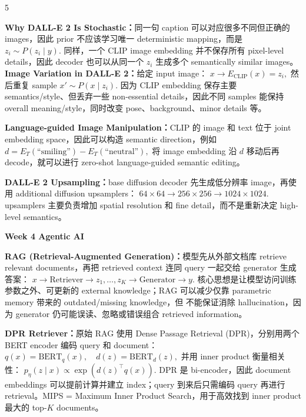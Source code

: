 \documentclass[a4paper, landscape]{article}
\newcommand{\topic}[1]{\par\medskip\textbf{#1}\par}
\renewcommand{\topic}[1]{%
  \par\smallskip\noindent
  \colorbox{highlightcolor}{%
    \parbox{\dimexpr\columnwidth-2\fboxsep\relax}{%
      \textbf{#1}%
    }%
  }%
  \par
}
\begin{document}
\begin{multicols}{5}
\par \textbf{Why DALL-E 2 Is Stochastic：}同一句 caption 可以对应很多不同但正确的 images，因此 prior 不应该学习唯一 deterministic mapping，而是
\(
z_i\sim P(z_i\mid y).
\)
同样，一个 CLIP image embedding 并不保存所有 pixel-level details，因此 decoder 也可以从同一个 \(z_i\) 生成多个 semantically similar images。
\textbf{Image Variation in DALL-E 2：}给定 input image：
\(
x\rightarrow E_{\mathrm{CLIP}}(x)=z_i,
\)
然后重复 sample
\(
x'\sim P(x\mid z_i).
\)
因为 CLIP embedding 保存主要 semantics/style、但丢弃一些 non-essential details，因此不同 samples 能保持 overall meaning/style，同时改变 pose、background、minor details 等。

\par \textbf{Language-guided Image Manipulation：}CLIP 的 image 和 text 位于 joint embedding space，因此可以构造 semantic direction，例如
\(
d=
E_T(\text{``smiling''})
-
E_T(\text{``neutral''}),
\)
将 image embedding 沿 \(d\) 移动后再 decode，就可以进行 zero-shot language-guided semantic editing。

\par \textbf{DALL-E 2 Upsampling：}base diffusion decoder 先生成低分辨率 image，再使用 additional diffusion upsamplers：
\(
64\times64
\rightarrow
256\times256
\rightarrow
1024\times1024.
\)
upsamplers 主要负责增加 spatial resolution 和 fine detail，而不是重新决定 high-level semantics。


\topic{Week 4 Agentic AI}
\par \textbf{RAG (Retrieval-Augmented Generation)：}模型先从外部文档库 retrieve relevant documents，再把 retrieved context 连同 query 一起交给 generator 生成答案：
\(
x \rightarrow \mathrm{Retriever} \rightarrow z_1,\ldots,z_K \rightarrow \mathrm{Generator} \rightarrow y.
\)
核心思想是让模型访问训练参数之外、可更新的 external knowledge；RAG 可以减少仅靠 parametric memory 带来的 outdated/missing knowledge，但 不能保证消除 hallucination，因为 generator 仍可能误读、忽略或错误组合 retrieved information。

\par \textbf{DPR Retriever：}原始 RAG 使用 Dense Passage Retrieval (DPR)，分别用两个 BERT encoder 编码 query 和 document：
\(
q(x)=\mathrm{BERT}_q(x),\quad d(z)=\mathrm{BERT}_d(z),
\)
并用 inner product 衡量相关性：
\(
p_\eta(z\mid x)\propto \exp(d(z)^\top q(x)).
\)
DPR 是 bi-encoder，因此 document embeddings 可以提前计算并建立 index；query 到来后只需编码 query 再进行 retrieval。MIPS = Maximum Inner Product Search，用于高效找到 inner product 最大的 top-\(K\) documents。


\end{multicols}
\end{document}
